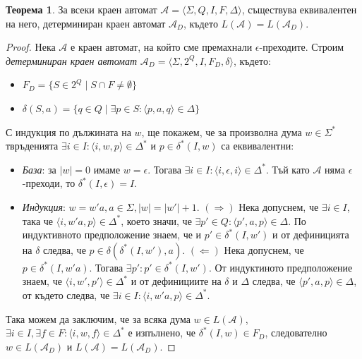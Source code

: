 \documentclass[12pt, oneside]{article}
\theoremstyle{definition}
\newtheorem{theorem}{Теорема}[section]
\begin{document}
\begin{theorem}
	За всеки краен автомат \(\mathcal{A} = \langle \Sigma, Q, I, F, \Delta \rangle \), съществува еквивалентен на него, детерминиран краен автомат \( \mathcal{A}_D \), където \( L(\mathcal{A}) = L(\mathcal{A}_D) \).
	\begin{proof}
		Нека \( \mathcal{A} \) е краен автомат, на който сме премахнали \( \epsilon \)-преходите. Строим \emph{детерминиран краен автомат} \( \mathcal{A}_D = \langle \Sigma, 2^Q, I, F_D, \delta \rangle \), където:
		\begin{itemize}
			\item \( F_D = \{ S \in 2^Q \mid S \cap F \neq \emptyset \} \)
			\item \( \delta(S,a) = \{ q \in Q \mid \exists p \in S : \langle p, a, q \rangle \in \Delta \} \)
		\end{itemize}
		С индукция по дължината на \( w \), ще покажем, че за произволна дума \( w \in \Sigma^* \) твръденията \( \exists i \in I: \langle i, w, p \rangle \in \Delta^* \) и \( p \in \delta^*(I, w)\) са еквивалентни:
		\begin{itemize}
			\item \emph{База}: за \( |w| = 0 \) имаме \( w = \epsilon \). Тогава \( \exists i \in I: \langle  i, \epsilon, i \rangle \in \Delta^* \). Тъй като \( \mathcal{A} \) няма \( \epsilon \)-преходи, то \( \delta^*(I, \epsilon) = I \).
			
			\item \emph{Индукция}: \( w = w'a, a \in \Sigma, |w| = |w'| + 1 \). \newline
			\( (\Rightarrow) \) Нека допуснем, че \( \exists i \in I \), така че \( \langle i, w'a, p \rangle \in \Delta^* \), което значи, че \( \exists p' \in Q: \langle p', a, p \rangle \in \Delta \). По индуктивното предположение знаем, че и \( p' \in \delta^*(I, w') \) и от дефиницията на \( \delta \) следва, че \( p \in \delta(\delta^*(I, w'), a) \). \newline
			\( (\Leftarrow) \) Нека допуснем, че \( p \in \delta^*(I, w'a) \). Тогава \( \exists p': p' \in \delta^*(I, w') \). От индуктиното предположение знаем, че \( \langle i, w', p' \rangle \in \Delta^* \) и от дефинициите на \( \delta  \) и \( \Delta \) следва, че \( \langle p', a, p \rangle \in \Delta \), от където следва, че \( \exists i \in I: \langle i, w'a, p \rangle \in \Delta^* \).
		\end{itemize}
		Така можем да заключим, че за всяка дума \( w \in L(\mathcal{A}) \), \( \exists i \in I, \exists f \in F : \langle i, w, f \rangle \in \Delta^* \) е изпълнено, че \( \delta^*(I, w) \in F_D \), следователно \( w \in L(\mathcal{A}_D) \) и \( L(\mathcal{A}) = L(\mathcal{A}_D) \).
	\end{proof}
\end{theorem}
\end{document}

